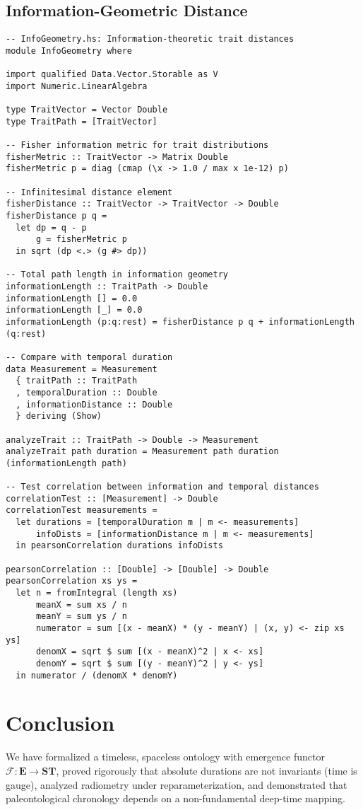 \documentclass[11pt]{article}
\theoremstyle{definition}
\theoremstyle{plain}
\theoremstyle{remark}
\newcommand{\Ecat}{\mathbf{E}}      %
\newcommand{\ST}{\mathbf{ST}}       %
\newcommand{\F}{\mathcal{F}}        %
\begin{document}
\subsection*{Information-Geometric Distance}
\begin{lstlisting}
-- InfoGeometry.hs: Information-theoretic trait distances
module InfoGeometry where

import qualified Data.Vector.Storable as V
import Numeric.LinearAlgebra

type TraitVector = Vector Double
type TraitPath = [TraitVector]

-- Fisher information metric for trait distributions
fisherMetric :: TraitVector -> Matrix Double
fisherMetric p = diag (cmap (\x -> 1.0 / max x 1e-12) p)

-- Infinitesimal distance element  
fisherDistance :: TraitVector -> TraitVector -> Double
fisherDistance p q = 
  let dp = q - p
      g = fisherMetric p
  in sqrt (dp <.> (g #> dp))

-- Total path length in information geometry
informationLength :: TraitPath -> Double  
informationLength [] = 0.0
informationLength [_] = 0.0
informationLength (p:q:rest) = fisherDistance p q + informationLength (q:rest)

-- Compare with temporal duration
data Measurement = Measurement
  { traitPath :: TraitPath
  , temporalDuration :: Double
  , informationDistance :: Double
  } deriving (Show)

analyzeTrait :: TraitPath -> Double -> Measurement
analyzeTrait path duration = Measurement path duration (informationLength path)

-- Test correlation between information and temporal distances
correlationTest :: [Measurement] -> Double
correlationTest measurements = 
  let durations = [temporalDuration m | m <- measurements]
      infoDists = [informationDistance m | m <- measurements]
  in pearsonCorrelation durations infoDists

pearsonCorrelation :: [Double] -> [Double] -> Double
pearsonCorrelation xs ys = 
  let n = fromIntegral (length xs)
      meanX = sum xs / n
      meanY = sum ys / n
      numerator = sum [(x - meanX) * (y - meanY) | (x, y) <- zip xs ys]
      denomX = sqrt $ sum [(x - meanX)^2 | x <- xs]
      denomY = sqrt $ sum [(y - meanY)^2 | y <- ys]
  in numerator / (denomX * denomY)
\end{lstlisting}

\section{Conclusion}
We have formalized a timeless, spaceless ontology with emergence functor $\F:\Ecat\to\ST$, proved rigorously that absolute durations are not invariants (time is gauge), analyzed radiometry under reparameterization, and demonstrated that paleontological chronology depends on a non-fundamental deep-time mapping. 
\end{document}

